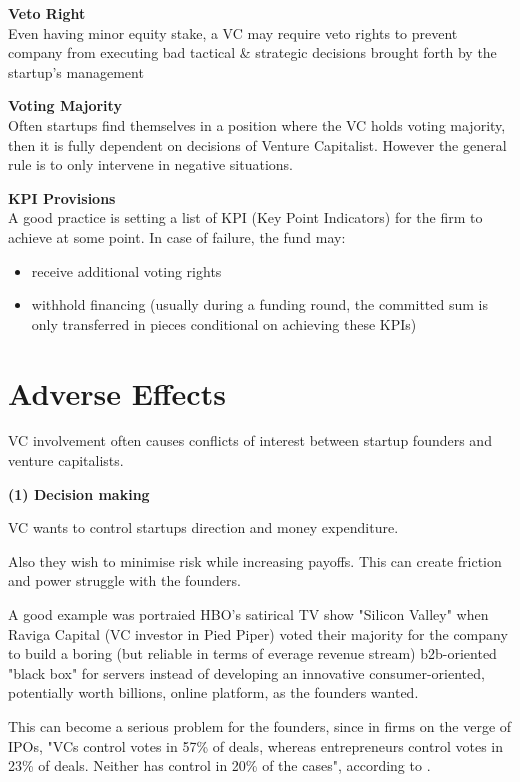     
    \textbf{Veto Right}\\
    Even having minor equity stake, a VC may require veto rights to prevent company from executing bad tactical \& strategic decisions brought forth by the startup's management

    \textbf{Voting Majority}\\
    Often startups find themselves in a position where the VC holds voting majority, then it is fully dependent on decisions of Venture Capitalist. However the general rule is to only intervene in negative situations.
    
    
    \textbf{KPI Provisions}\\
    A good practice is setting a list of KPI (Key Point Indicators) for the firm to achieve at some point. In case of failure, the fund may:
    \begin{itemize}
        \item receive additional voting rights
        \item withhold financing (usually during a funding round, the committed sum is only transferred in pieces conditional on achieving these KPIs)
    \end{itemize}
    

    
\section{Adverse Effects}

    VC involvement often causes conflicts of interest between startup founders and venture capitalists.
    
    
    \textbf{(1) Decision making}
    
    VC wants to control startups direction and  money expenditure.
    
    Also they wish to minimise risk while increasing payoffs. This can create friction and power struggle with the founders.
    
    A good example was portraied HBO's satirical TV show "Silicon Valley" when Raviga Capital (VC investor in Pied Piper) voted their majority for the company to build a boring (but reliable in terms of everage revenue stream) b2b-oriented "black box" for servers instead of developing an innovative consumer-oriented, potentially worth billions, online platform, as the founders wanted.
    
    This can become a serious problem for the founders, since in firms on the verge of IPOs, "VCs control votes in 57\% of deals, whereas entrepreneurs control votes in 23\% of deals. Neither has control in 20\% of the cases", according to \parencite{schoar:2011}.
    
